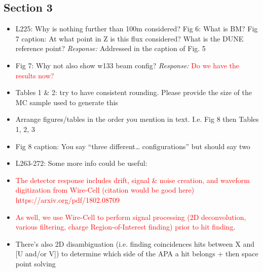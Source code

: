 \documentclass[11pt]{article}
\begin{document}
\subsection*{Section 3}
\begin{itemize}
    \item L225: Why is nothing further than 100m considered? Fig 6: What is BM? Fig 7 caption: At what point in Z is this flux considered? What is the DUNE reference point? 
    \textit{Response:} Addressed in the caption of Fig. 5
    
    \item Fig 7: Why not also show w133 beam config? 
    \textit{Response:} \textcolor{red}{Do we have the results now?}
    
    \item Tables 1 \& 2: try to have consistent rounding. Please provide the size of the MC sample used to generate this 
    \item Arrange figures/tables in the order you mention in text. I.e. Fig 8 then Tables 1, 2, 3 
    \item Fig 8 caption: You say “three different… configurations” but should say two 
    \item L263-272: Some more info could be useful:
    \item \textcolor{red}{The detector response includes drift, signal \& noise creation, and waveform digitization from Wire-Cell (citation would be good here) https://arxiv.org/pdf/1802.08709}
    \item \textcolor{red}{As well, we use Wire-Cell to perform signal processing (2D deconvolution, various filtering, charge Region-of-Interest finding) prior to hit finding}.
    \item There’s also 2D disambiguation (i.e. finding coincidences hits between X and [U and/or V]) to determine which side of the APA a hit belongs + then space point solving
\end{itemize}
\end{document}
